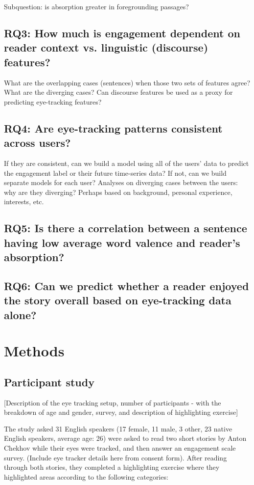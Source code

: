 \documentclass[11pt]{article}
\begin{document}
Subquestion: is absorption greater in foregrounding passages?

\subsection{RQ3: How much is engagement dependent on reader context vs. linguistic (discourse) features?}

What are the overlapping cases (sentences) when those two sets of features agree? What are the diverging cases? Can discourse features be used as a proxy for predicting eye-tracking features?

\subsection{RQ4: Are eye-tracking patterns consistent across users?}

If they are consistent, can we build a model using all of the users’ data to predict the engagement label or their future time-series data? If not, can we build separate models for each user? Analyses on diverging cases between the users: why are they diverging? Perhaps based on background, personal experience, interests, etc.

\subsection{RQ5: Is there a correlation between a sentence having low average word valence and reader’s absorption?}

\subsection{RQ6: Can we predict whether a reader enjoyed the story overall based on eye-tracking data alone?}

\section{Methods}

\subsection{Participant study}

[Description of the eye tracking setup, number of participants - with the breakdown of age and gender, survey, and description of highlighting exercise]

The study asked 31 English speakers (17 female, 11 male, 3 other, 23 native English speakers, average age: 26) were asked to read two short stories by Anton Chekhov while their eyes were tracked, and then answer an engagement scale survey. (Include eye tracker details here from consent form). After reading through both stories, they completed a highlighting exercise where they highlighted areas according to the following categories:
\end{document}
